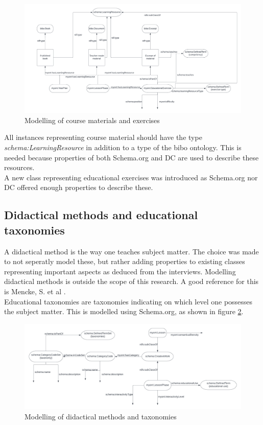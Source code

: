 \documentclass[12pt,journal]{IEEEtran}
\begin{document}
\begin{figure}[h]
	\centering
	\caption{Modelling of course materials and exercises}
	\label{fig:uml-materialdata}
	\includegraphics[scale=0.25]{uml-materialdata.png}
\end{figure}
\noindent All instances representing course material should have the type \textit{schema:LearningResource} in addition to a type of the bibo ontology.
This is needed because properties of both Schema.org and DC are used to describe these resources.\\
A new class representing educational exercises was introduced as Schema.org nor DC offered enough properties to describe these.

\subsection{Didactical methods and educational taxonomies}

\noindent A didactical method is the way one teaches subject matter.
The choice was made to not seperatly model these, but rather adding properties to existing classes representing important aspects as deduced from the interviews.
Modelling didactical methods is outside the scope of this research. A good reference for this is Mencke, S. et al \cite{hierarchy}.\\
Educational taxonomies are taxonomies indicating on which level one possesses the subject matter.
This is modelled using Schema.org, as shown in figure \ref{fig:uml-dm}.

\begin{figure}[h]
	\caption{Modelling of didactical methods and taxonomies}
	\label{fig:uml-dm}
	\includegraphics[scale=0.3]{uml-taxonomies.png}
\end{figure}
\end{document}
